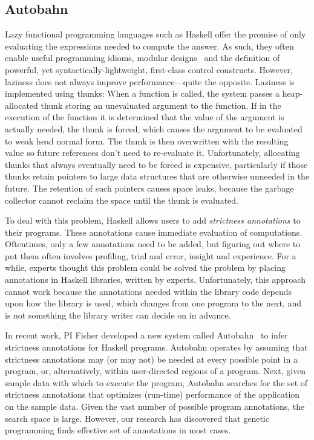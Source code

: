 \subsection{Autobahn}

Lazy functional programming languages such as
Haskell offer the promise of only evaluating the expressions needed
to compute the answer. As such, they often enable useful programming
idioms, modular designs~\cite{?} and the definition of powerful,
yet syntactically-lightweight, first-class control constructs. 
However, laziness does not always improve performance---quite the
opposite.  Laziness is implemented using thunks: When a function is called, the
system passes a heap-allocated thunk storing an unevaluated argument to
the function. If in the execution of the function it is determined that
the value of the argument is actually needed, the thunk is forced,
which causes the argument to be evaluated to weak head normal
form. The thunk is then overwritten with the resulting value so future
references don’t need to re-evaluate it.  Unfortunately,
allocating thunks that always eventually need to be forced is expensive,
particularly if those thunks retain pointers to large data structures
that are otherwise unneeded in the future.  The retention of such
pointers causes space leaks, because the garbage collector cannot
reclaim the space until the thunk is evaluated.

To deal with this problem, Haskell allows users to add
\emph{strictness annotations} to their programs.  These annotations
cause immediate evaluation of computations. Oftentimes, only a few
annotations need to be added, but figuring out where to put them often
involves profiling, trial and error, insight and experience.  For a
while, experts thought this problem could be solved the problem by
placing annotations in Haskell libraries, written by
experts. Unfortunately, this approach cannot work because the
annotations needed within the library code depends upon how the
library is used, which changes from one program to the next, and is
not something the library writer can decide on in advance.

In recent work, PI Fisher developed a new system called Autobahn~\cite{autobahn}
to infer strictness annotations for Haskell programs.  Autobahn
operates by assuming that strictness annotations may (or may not) be
needed at every possible point in a program, or, alternatively, within
user-directed regions of a program.  Next, given sample data with which to
execute the program, Autobahn searches for the set of strictness annotations
that optimizes (run-time) performance of the application on the sample data.
Given the vast number of possible program annotations, the search space is 
large.  However, our research has discovered that genetic programming finds
effective set of annotations in most cases.

